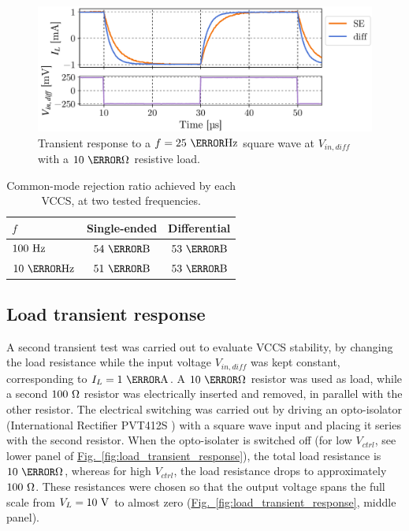 \documentclass[10pt]{article}
\newcommand{\brieffiglink}[1]{\hyperref[#1]{Fig.~\ref*{#1}}}
\begin{document}
\begin{figure}[b!]
	\centering
    \includegraphics[scale=.6]{fig_transients.pdf}
	\caption{\small Transient response to a $f=25~\kilo\hertz$ square wave at $V_{in,diff}$ with a $10~\kilo\ohm$ resistive load.}
	\label{fig:transient_response}
\end{figure}

\begin{table}[t!]
\centering
\bgroup
\def\arraystretch{1.3}
\begin{tabularx}{.54\textwidth}{ a|c|c }
$f$ & Single-ended & Differential \\
\hline
{} $100~\hertz$ &  $54~\deci\bel$ &  $53~\deci\bel$ \\
 $10~\kilo\hertz$ &  $51~\deci\bel$ &  $53~\deci\bel$ \\
\end{tabularx}\egroup
\caption{Common-mode rejection ratio achieved by each VCCS, at two tested frequencies.}
\label{tbl:cmrr}
\end{table}


\subsection{Load transient response}

A second transient test was carried out to evaluate VCCS stability, by changing the load resistance while the input voltage $V_{in,diff}$ was kept constant, corresponding to $I_L=1~\milli\ampere$. A $10~\kilo\ohm$ resistor was used as load, while a second $100~\ohm$ resistor was electrically inserted and removed, in parallel with the other resistor. The electrical switching was carried out by driving an opto-isolator (International Rectifier PVT412S \cite{PVT412_datasheet}) with a square wave input and placing it series with the second resistor. When the opto-isolater is switched off (for low $V_{ctrl}$, see lower panel of \brieffiglink{fig:load_transient_response}), the total load resistance is $10~\kilo\ohm$, whereas for high $V_{ctrl}$, the load resistance drops to approximately $100~\ohm$. These resistances were chosen so that the output voltage spans the full scale from $V_L=10~\volt$ to almost zero (\brieffiglink{fig:load_transient_response}, middle panel).
\end{document}
